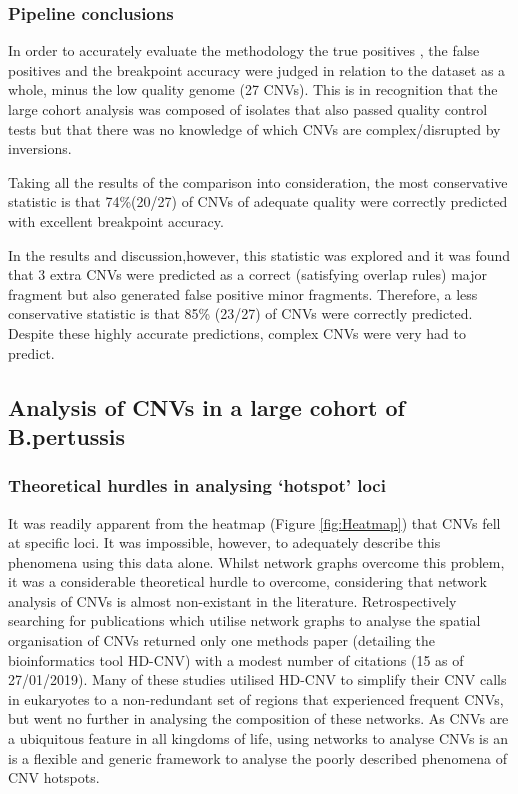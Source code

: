 \documentclass{article}
\begin{document}
\subsubsection{Pipeline conclusions}
In order to accurately evaluate the methodology the true positives , the false positives and the breakpoint accuracy were judged in relation to the dataset as a whole, minus the low quality genome (27 CNVs). This is in recognition that the large cohort analysis was composed of isolates that also passed quality control tests but that there was no knowledge of which CNVs are complex/disrupted by inversions. 

Taking all the results of the comparison into consideration, the most conservative statistic is that 74\%(20/27) of CNVs of adequate quality were correctly predicted with excellent breakpoint accuracy. 

In the results and discussion,however, this statistic was explored and it was found that 3 extra CNVs were predicted as a correct (satisfying overlap rules) major fragment  but also generated false positive minor fragments. Therefore, a less conservative statistic is that 85\% (23/27) of CNVs were correctly predicted. Despite these highly accurate predictions, complex CNVs were very had to predict.




\subsection{Analysis of CNVs in a large cohort of B.pertussis}


\subsubsection{Theoretical hurdles in analysing `hotspot' loci}


It was readily apparent from the heatmap (Figure \ref{fig:Heatmap}) that CNVs fell at specific loci. It was impossible, however, to adequately describe this phenomena using this data alone. Whilst network graphs overcome this problem, it was a considerable theoretical hurdle to overcome, considering that network analysis of CNVs is almost non-existant in the literature. Retrospectively searching for publications which utilise network graphs to analyse the spatial organisation of CNVs returned only one methods paper (detailing the bioinformatics tool HD-CNV) with a modest number of citations (15 as of 27/01/2019). Many of these studies utilised HD-CNV to simplify their CNV calls in eukaryotes to a non-redundant set of regions that experienced frequent CNVs, but went no further in analysing the composition of these networks. As CNVs are a ubiquitous feature in all kingdoms of life, using networks to analyse CNVs is an is a flexible and generic framework to analyse the poorly described phenomena of CNV hotspots.
\end{document}

